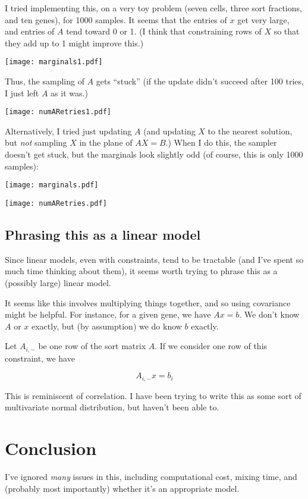 \documentclass{article}
\begin{document}
I tried implementing this, on a very toy problem (seven cells, three sort fractions,
and ten genes), for 1000 samples. It seems that the entries of $x$ get very large,
and entries of $A$ tend toward 0 or 1.
(I think that constraining rows of $X$ so that they add up to 1 might improve this.)


\texttt{[image: marginals1.pdf]}

Thus, the sampling of $A$ gets ``stuck'' (if the update didn't
succeed after 100 tries, I just left $A$ as it was.)

\texttt{[image: numARetries1.pdf]}


Alternatively, I tried just updating $A$ (and updating $X$ to the nearest
solution, but {\em not} sampling $X$ in the plane of $AX=B$.)
When I do this, the sampler doesn't get stuck, but the marginals look 
slightly odd (of course, this is only 1000 samples):

\texttt{[image: marginals.pdf]}

\texttt{[image: numARetries.pdf]}

\subsection{Phrasing this as a linear model}

Since linear models, even with constraints, tend to be tractable (and I've spent so
much time thinking about them), it seems worth trying to phrase
this as a (possibly large) linear model.

It seems like this involves multiplying things together, and so using covariance might
be helpful. For instance, for a given gene, we have $Ax = b$. We don't know $A$ or $x$
exactly, but (by assumption) we do know $b$ exactly. 

Let $A_{i,-}$ be one row of the sort matrix $A$.
If we consider one row of this constraint, we have

\[
A_{i,-}x = b_i
\]

This is reminiscent of correlation. I have been trying to write this as some sort
of multivariate normal distribution, but haven't been able to.

\section{Conclusion}

I've ignored {\em many} issues in this, including computational cost,
mixing time, and (probably most importantly) whether it's an appropriate model.



\end{document}
